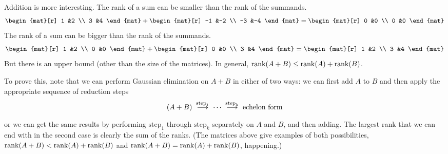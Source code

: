 \begin{exercises}
\begin{answer}
      Addition is more interesting.
      The rank of a sum can be smaller than the rank of the summands.
      \begin{equation*}
        \begin{mat}[r]
          1  &2  \\
          3  &4
        \end{mat}
        +
        \begin{mat}[r]
         -1  &-2  \\
         -3  &-4
        \end{mat}
        =
        \begin{mat}[r]
         0   &0   \\
         0   &0
        \end{mat}
      \end{equation*}
      The rank of a sum can be bigger than the rank of the summands.
      \begin{equation*}
        \begin{mat}[r]
          1  &2  \\
          0  &0
        \end{mat}
        +
        \begin{mat}[r]
          0  &0   \\
          3  &4
        \end{mat}
        =
        \begin{mat}[r]
         1   &2   \\
         3   &4
        \end{mat}
      \end{equation*}
      But there is an upper bound (other than the size of the matrices).
      In general, \( \operatorname{rank}(A+B)\leq\operatorname{rank}(A)+\operatorname{rank}(B) \).

      To prove this, note that we can perform Gaussian elimination on
      \( A+B \) in either of two ways:
      we can first add \( A \) to \( B \) and then apply the appropriate
      sequence of reduction steps
      \begin{equation*}
        (A+B)
        \;\mathrel{ \mathop{\longrightarrow}\limits^{\text{step}_1\mathstrut}_{ \begin{subarray}{l} \relax \end{subarray}}}
        \;\cdots
        \;\mathrel{ \mathop{\longrightarrow}\limits^{\text{step}_k\mathstrut}_{ \begin{subarray}{l} \relax \end{subarray}}}
        \;\text{echelon form}
      \end{equation*}
      or we can get the same results by performing \( \text{step}_1 \) through
      \( \text{step}_k \) separately on \( A \) and \( B \), and then adding.
      The largest rank that we can end with in the second case is clearly 
      the sum of the ranks.
      (The matrices above give examples of both possibilities,  
       $\operatorname{rank}(A+B)<\operatorname{rank}(A)+\operatorname{rank}(B)$ and $\operatorname{rank}(A+B)=\operatorname{rank}(A)+\operatorname{rank}(B)$,
       happening.)
    \end{answer}
\end{exercises}

